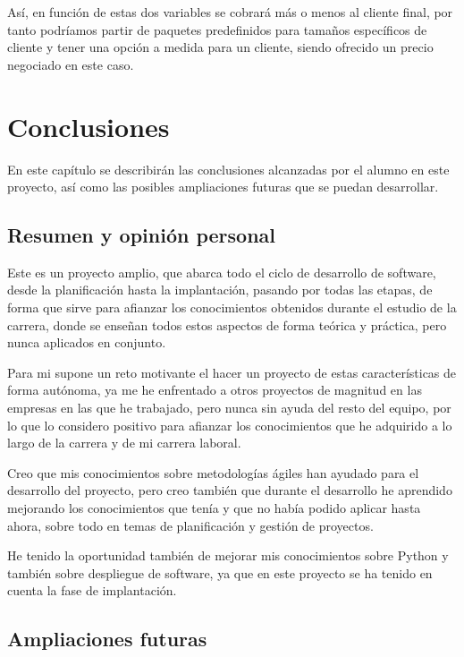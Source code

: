 \documentclass[12pt,a4paperpaper,]{report}
\begin{document}
Así, en función de estas dos variables se cobrará más o menos al cliente
final, por tanto podríamos partir de paquetes predefinidos para tamaños
específicos de cliente y tener una opción a medida para un cliente,
siendo ofrecido un precio negociado en este caso.

\chapter{Conclusiones}\label{conclusiones}

En este capítulo se describirán las conclusiones alcanzadas por el
alumno en este proyecto, así como las posibles ampliaciones futuras que
se puedan desarrollar.

\section{Resumen y opinión
personal}\label{resumen-y-opiniuxf3n-personal}

Este es un proyecto amplio, que abarca todo el ciclo de desarrollo de
software, desde la planificación hasta la implantación, pasando por
todas las etapas, de forma que sirve para afianzar los conocimientos
obtenidos durante el estudio de la carrera, donde se enseñan todos estos
aspectos de forma teórica y práctica, pero nunca aplicados en conjunto.

Para mi supone un reto motivante el hacer un proyecto de estas
características de forma autónoma, ya me he enfrentado a otros proyectos
de magnitud en las empresas en las que he trabajado, pero nunca sin
ayuda del resto del equipo, por lo que lo considero positivo para
afianzar los conocimientos que he adquirido a lo largo de la carrera y
de mi carrera laboral.

Creo que mis conocimientos sobre metodologías ágiles han ayudado para el
desarrollo del proyecto, pero creo también que durante el desarrollo he
aprendido mejorando los conocimientos que tenía y que no había podido
aplicar hasta ahora, sobre todo en temas de planificación y gestión de
proyectos.

He tenido la oportunidad también de mejorar mis conocimientos sobre
Python y también sobre despliegue de software, ya que en este proyecto
se ha tenido en cuenta la fase de implantación.

\section{Ampliaciones futuras}\label{ampliaciones-futuras}
\end{document}
